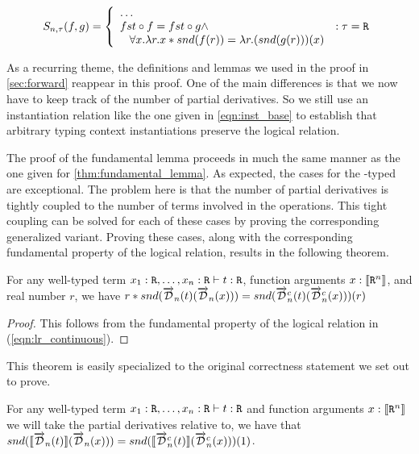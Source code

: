   \begin{equation}
    S_{n, \tau}(f, g) =
      \left\{
        \begin{array}{ll}
          \dots \\
          fst \circ f = fst \circ g \wedge
            & : \tau = \texttt{R} \\
          \;\;\;\forall x. \lambda r. x * snd(f(r)) = \lambda r. (snd(g(r)))(x)
        \end{array}
      \right.
  \label{eqn:lr_continuous}
  \end{equation}

  As a recurring theme, the definitions and lemmas we used in the proof in \cref{sec:forward} reappear in this proof.
  One of the main differences is that we now have to keep track of the number of partial derivatives.
  So we still use an instantiation relation like the one given in \cref{eqn:inst_base} to establish that arbitrary typing context instantiations preserve the logical relation.

  The proof of the fundamental lemma proceeds in much the same manner as the one given for \cref{thm:fundamental_lemma}.
  As expected, the cases for the \synR-typed are exceptional.
  The problem here is that the number of partial derivatives is tightly coupled to the number of terms involved in the operations.
  This tight coupling can be solved for each of these cases by proving the corresponding generalized variant.
  Proving these cases, along with the corresponding fundamental property of the logical relation, results in the following theorem.

  \begin{theorem}[Duality]
    For any well-typed term $x_1 : \texttt{R}, \dots, x_n : \texttt{R} \vdash t : \texttt{R}$, function arguments $x : \llbracket \texttt{R}^n \rrbracket$, and real number $r$, we have $r * snd(\overrightarrow{\mathcal{D}}_n(t)(\overrightarrow{\mathcal{D}}_n(x))) = snd(\overrightarrow{\mathcal{D}}^c_n(t)(\overrightarrow{\mathcal{D}}^c_n(x)))(r)$
  \end{theorem}
  \begin{proof}
    This follows from the fundamental property of the logical relation in (\cref{eqn:lr_continuous}).
  \end{proof}

  This theorem is easily specialized to the original correctness statement we set out to prove.
  \begin{corollary}
    For any well-typed term $x_1 : \texttt{R}, \dots, x_n : \texttt{R} \vdash t : \texttt{R}$ and function arguments $x : \llbracket \texttt{R}^n \rrbracket$ we will take the partial derivatives relative to, we have that $snd(\llbracket\overrightarrow{\mathcal{D}}_n(t)\rrbracket (\overrightarrow{\mathcal{D}}_n(x))) = snd(\llbracket\overrightarrow{\mathcal{D}}^c_n(t)\rrbracket (\overrightarrow{\mathcal{D}}^c_n(x)))(1)$.
  \end{corollary}
